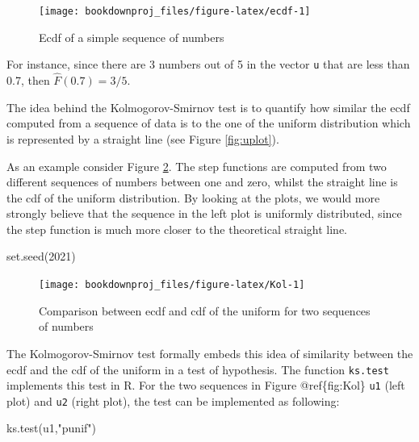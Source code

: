 \documentclass[
]{book}
\newenvironment{Shaded}{\begin{snugshade}}{\end{snugshade}}
\newcommand{\DecValTok}[1]{\textcolor[rgb]{0.00,0.00,0.81}{#1}}
\newcommand{\FunctionTok}[1]{\textcolor[rgb]{0.00,0.00,0.00}{#1}}
\newcommand{\NormalTok}[1]{#1}
\newcommand{\StringTok}[1]{\textcolor[rgb]{0.31,0.60,0.02}{#1}}
\begin{document}
\begin{figure}

{\centering \texttt{[image: bookdownproj\_files/figure-latex/ecdf-1]} 

}

\caption{Ecdf of a simple sequence of numbers}\label{fig:ecdf}
\end{figure}

For instance, since there are 3 numbers out of 5 in the vector \texttt{u} that are less than 0.7, then \(\hat{F}(0.7)=3/5\).

The idea behind the Kolmogorov-Smirnov test is to quantify how similar the ecdf computed from a sequence of data is to the one of the uniform distribution which is represented by a straight line (see Figure \ref{fig:uplot}).

As an example consider Figure \ref{fig:Kol}. The step functions are computed from two different sequences of numbers between one and zero, whilst the straight line is the cdf of the uniform distribution. By looking at the plots, we would more strongly believe that the sequence in the left plot is uniformly distributed, since the step function is much more closer to the theoretical straight line.

\begin{Shaded}
\begin{Highlighting}[]
\FunctionTok{set.seed}\NormalTok{(}\DecValTok{2021}\NormalTok{)}
\end{Highlighting}
\end{Shaded}

\begin{figure}

{\centering \texttt{[image: bookdownproj\_files/figure-latex/Kol-1]} 

}

\caption{Comparison between ecdf and cdf of the uniform for two sequences of numbers}\label{fig:Kol}
\end{figure}

The Kolmogorov-Smirnov test formally embeds this idea of similarity between the ecdf and the cdf of the uniform in a test of hypothesis. The function \texttt{ks.test} implements this test in R. For the two sequences in Figure @ref\{fig:Kol\} \texttt{u1} (left plot) and \texttt{u2} (right plot), the test can be implemented as following:

\begin{Shaded}
\begin{Highlighting}[]
\FunctionTok{ks.test}\NormalTok{(u1,}\StringTok{"punif"}\NormalTok{)}
\end{Highlighting}
\end{Shaded}
\end{document}
